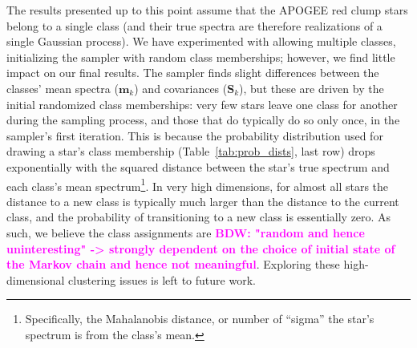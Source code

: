 \documentclass[a4paper,fleqn,usenatbib]{mnras}
\newcommand{\specmean}{{\bm m}}
\newcommand{\speccov}{{\bm S}}
\newcommand{\bdw}[1]{\textbf{\textcolor{magenta}{BDW: #1}}}
\begin{document}
The results presented up to this point assume that the APOGEE red clump stars belong to a single class (and their true spectra are therefore realizations of a single Gaussian process). We have experimented with allowing multiple classes, initializing the sampler with random class memberships; however, we find little impact on our final results. The sampler finds slight differences between the classes' mean spectra ($\specmean_k$) and covariances ($\speccov_k$), but these are driven by the initial randomized class memberships: very few stars leave one class for another during the sampling process, and those that do typically do so only once, in the sampler's first iteration. This is because the probability distribution used for drawing a star's class membership (Table~\ref{tab:prob_dists}, last row) drops exponentially with the squared distance between the star's true spectrum and each class's mean spectrum\footnote{Specifically, the Mahalanobis distance, or number of ``sigma'' the star's spectrum is from the class's mean.}. In very high dimensions, for almost all stars the distance to a new class is typically much larger than the distance to the current class, and the probability of transitioning to a new class is essentially zero. As such, we believe the class assignments are \bdw{"random and hence uninteresting" -> strongly dependent on the choice of initial state of the Markov chain and hence not meaningful}. Exploring these high-dimensional clustering issues is left to future work. 
\end{document}

